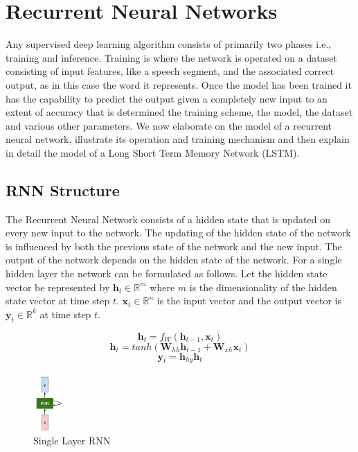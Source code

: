 \chapter{Recurrent Neural Networks}

Any supervised deep learning algorithm consists of primarily two phases i.e., training and inference. Training is where the network is operated on a dataset consisting of input features, like a speech segment, and the associated correct output, as in this case the word it represents. Once the model has been trained it has the capability to predict the output given a completely new input to an extent of accuracy that is determined the training scheme, the model, the dataset and various other parameters. We now elaborate on the model of a recurrent neural network, illustrate its operation and training mechanism and then explain in detail the model of a Long Short Term Memory Network (LSTM).

\section{RNN Structure}
The Recurrent Neural Network consists of a hidden state that is updated on every new input to the network. The updating of the hidden state of the network is influenced by both the previous state of the network and the new input. The output of the network depends on the hidden state of the network. For a single hidden layer the network can be formulated as follows.
Let the hidden state vector be represented by $\mathbf{h}_t\in\mathbb{R}^{m}$ where $m$ is the dimensionality of the hidden state vector at time step $t$. $\mathbf{x}_t\in\mathbb{R}^{n}$ is the input vector and the output vector is $\mathbf{y}_t\in\mathbb{R}^{k}$ at time step $t$.

\begin{equation}
\mathbf{h}_t = f_W(\mathbf{h}_{t-1},\mathbf{x}_t)
\end{equation}
\begin{equation}
\mathbf{h}_t = tanh(\mathbf{W}_{hh}\mathbf{h}_{t-1} + \mathbf{W}_{xh}\mathbf{x}_t)
\end{equation}
\begin{equation}
\mathbf{y}_t = \mathbf{h}_{hy}\mathbf{h}_t
\end{equation}

\begin{figure}[h]
	\caption{Single Layer RNN}    
    \centering
    \includegraphics[width=0.1\textwidth]{rnnvanilla}
\end{figure}

